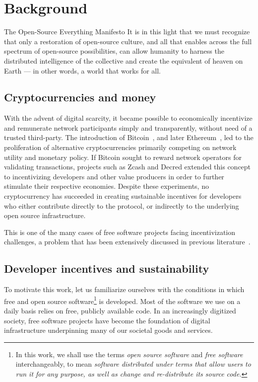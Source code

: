 \section{Background}

\begin{epigraph}{The Open-Source Everything Manifesto}
    \noindent It is in this light that we must recognize that only a restoration of
    open-source culture, and all that enables across the full spectrum of
    open-source possibilities, can allow humanity to harness the distributed
    intelligence of the collective and create the equivalent of heaven on Earth
    --- in other words, a world that works for all.
\end{epigraph}

\subsection{Cryptocurrencies and money}

With the advent of digital scarcity, it became possible to economically
incentivize and remunerate network participants simply and transparently,
without need of a trusted third-party. The introduction of
Bitcoin~\cite{bitcoin}, and later Ethereum~\cite{ethereum}, led to the
proliferation of alternative cryptocurrencies primarily competing on network
utility and monetary policy.  If Bitcoin sought to reward network operators for
validating transactions, projects such as Zcash and Decred extended this
concept to incentivizing developers and other value producers in order to
further stimulate their respective economies. Despite these experiments,
no cryptocurrency has succeeded in creating sustainable incentives for
developers who either contribute directly to the protocol, or indirectly to the
underlying open source infrastructure.

This is one of the many cases of free software projects facing incentivization
challenges, a problem that has been extensively discussed in previous
literature~\cite{roads and bridges}.

\subsection{Developer incentives and sustainability}
\label{s:incentives}

To motivate this work, let us familiarize ourselves with the
conditions in which free and open source software\footnote{In this work, we
shall use the terms \emph{open source software} and \emph{free software} interchangeably,
to mean \emph{software distributed under terms that allow users to run it
for any purpose, as well as change and re-distribute its source code.}}
is developed. Most of the software we use on a daily basis relies on free,
publicly available code. In an increasingly digitized society, free software
projects have become the foundation of digital infrastructure underpinning many
of our societal goods and services.

